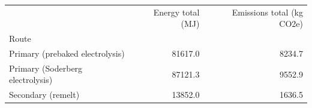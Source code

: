 \begin{tabular}{lrr}
\toprule
 & Energy total (MJ) & Emissions total (kg CO2e) \\
Route &  &  \\
\midrule
Primary (prebaked electrolysis) & 81617.0 & 8234.7 \\
Primary (Soderberg electrolysis) & 87121.3 & 9552.9 \\
Secondary (remelt) & 13852.0 & 1636.5 \\
\bottomrule
\end{tabular}
